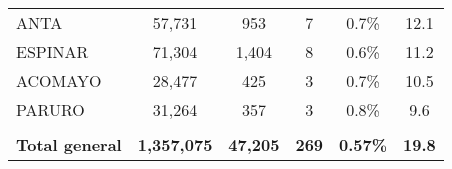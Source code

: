 \begin{tabular}{lccccc}
	\cellcolor[HTML]{FFFF99}ANTA                                    & 57,731               & 953                                  & 7                    & 0.7\%                      & 12.1                                        \\
	\cellcolor[HTML]{FFFF99}ESPINAR                                 & 71,304               & 1,404                                & 8                    & 0.6\%                      & 11.2                                        \\
	\cellcolor[HTML]{FFFF99}ACOMAYO                                 & 28,477               & 425                                  & 3                    & 0.7\%                      & 10.5                                        \\
	\cellcolor[HTML]{FFFF99}PARURO                                  & 31,264               & 357                                  & 3                    & 0.8\%                      & 9.6                                         \\
	& \multicolumn{1}{l}{} & \multicolumn{1}{l}{}                 & \multicolumn{1}{l}{} & \multicolumn{1}{l}{}       & \multicolumn{1}{l}{}                        \\
	\rowcolor[HTML]{DDEBF7} 
	\textbf{Total general}                                          & \textbf{1,357,075}   & \textbf{47,205}                      & \textbf{269}         & \textbf{0.57\%}            & \textbf{19.8}                              
\end{tabular}